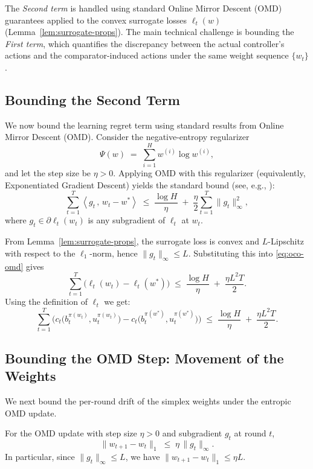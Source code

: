 The \emph{Second term} is handled using standard Online Mirror Descent (OMD) guarantees applied to the convex surrogate losses \(\ell_t(w)\) (Lemma~\ref{lem:surrogate-props}).  
The main technical challenge is bounding the \emph{First term}, which quantifies the discrepancy between the actual controller’s actions and the comparator-induced actions under the same weight sequence \(\{w_t\}\).


\subsection{Bounding the Second Term}

We now bound the learning regret term using standard results from Online Mirror Descent (OMD).  
Consider the negative-entropy regularizer
\[
\Psi(w) \;=\; \sum_{i=1}^H w^{(i)} \log w^{(i)},
\]
and let the step size be \(\eta > 0\).  
Applying OMD with this regularizer (equivalently, Exponentiated Gradient Descent) yields the standard bound (see, e.g., \cite{orabona_modern_2023}):
\begin{equation}
\label{eq:oco-omd}
\sum_{t=1}^T 
\left\langle 
g_t
\,,\, 
w_t - w^*
\right\rangle
\;\le\;
\frac{\log H}{\eta}
\;+\; \frac{\eta}{2}\sum_{t=1}^T \|g_t\|_\infty^2,
\end{equation}
where \(g_t \in \partial \ell_t(w_t)\) is any subgradient of \(\ell_t\) at \(w_t\).   

From Lemma~\ref{lem:surrogate-props}, the surrogate loss is convex and \(L\)-Lipschitz with respect to the \(\ell_1\)-norm, hence \(\|g_t\|_\infty \le L\).  
Substituting this into \eqref{eq:oco-omd} gives
\[
\sum_{t=1}^T \bigl(\ell_t(w_t) - \ell_t(w^*)\bigr)
\;\le\;
\frac{\log H}{\eta}
\;+\; \frac{\eta L^2 T}{2}.
\]
Using the definition of $\ell_t$ we get:
\begin{equation}
\label{eq:oco-omd-2}
\sum_{t=1}^T \Big( c_t\big(b_t^{\pi(w_t)},u_t^{\pi(w_t)}\big) - c_t\big(b_t^{\pi(w^*)}, u_t^{\pi(w^*)}\big)\Big)
    \;\le\;
\frac{\log H}{\eta}
\;+\; \frac{\eta L^2 T}{2}.
\end{equation}

\subsection{Bounding the OMD Step: Movement of the Weights}

We next bound the per-round drift of the simplex weights under the entropic OMD update.

\begin{Thm:Lemma}
\label{lem:omd-move}
For the OMD update with step size \(\eta > 0\) and subgradient \(g_t\) at round \(t\),
\[
\|w_{t+1}-w_t\|_1 \;\le\; \eta\,\|g_t\|_\infty.
\]
In particular, since \(\|g_t\|_\infty \le L\), we have \(\|w_{t+1}-w_t\|_1 \le \eta L\).
\end{Thm:Lemma}

